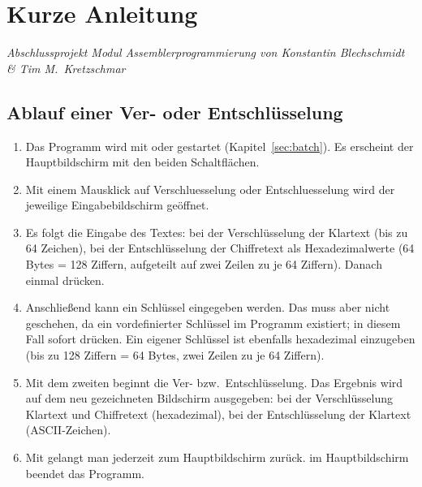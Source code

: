 \section{Kurze Anleitung}\label{sec:anleitung}
\textit{Abschlussprojekt Modul \glqq Assemblerprogrammierung\grqq{} von Konstantin Blechschmidt \& Tim M.\ Kretzschmar}

\subsection{Ablauf einer Ver- oder Entschlüsselung}
\begin{enumerate}[label=\arabic*.,noitemsep]
    \item Das Programm wird mit  oder  gestartet (Kapitel~\ref{sec:batch}). Es erscheint der Hauptbildschirm mit den beiden Schaltflächen.
    \item Mit einem Mausklick auf \glqq Verschluesselung\grqq{} oder \glqq Entschluesselung\grqq{} wird der jeweilige Eingabebildschirm geöffnet.
    \item Es folgt die Eingabe des Textes: bei der Verschlüsselung der Klartext (bis zu 64 Zeichen), bei der Entschlüsselung der Chiffretext als Hexadezimalwerte (64 Bytes = 128 Ziffern, aufgeteilt auf zwei Zeilen zu je 64 Ziffern). Danach einmal  drücken.
    \item Anschließend kann ein Schlüssel eingegeben werden. Das muss aber nicht geschehen, da ein vordefinierter Schlüssel im Programm existiert; in diesem Fall sofort  drücken. Ein eigener Schlüssel ist ebenfalls hexadezimal einzugeben (bis zu 128 Ziffern = 64 Bytes, zwei Zeilen zu je 64 Ziffern).
    \item Mit dem zweiten  beginnt die Ver- bzw.\ Entschlüsselung. Das Ergebnis wird auf dem neu gezeichneten Bildschirm ausgegeben: bei der Verschlüsselung Klartext und Chiffretext (hexadezimal), bei der Entschlüsselung der Klartext (ASCII-Zeichen).
    \item Mit  gelangt man jederzeit zum Hauptbildschirm zurück.  im Hauptbildschirm beendet das Programm.
\end{enumerate}

